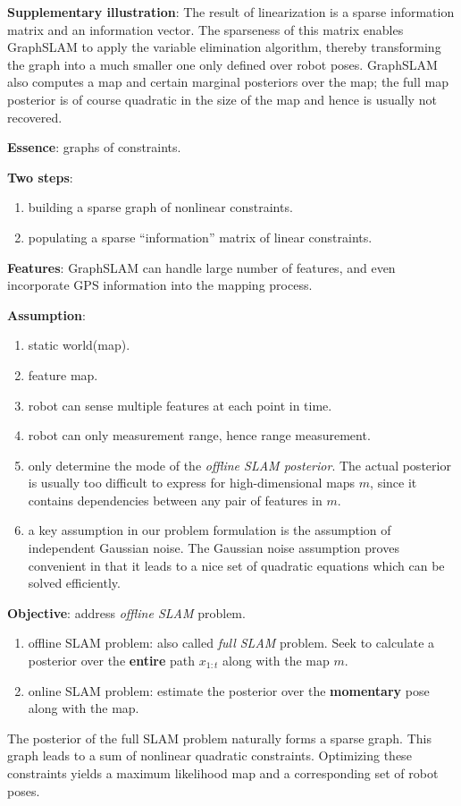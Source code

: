 \textbf{Supplementary illustration}: The result of linearization is a sparse information matrix and an information vector. The sparseness of this matrix enables GraphSLAM to apply the variable elimination algorithm, thereby transforming the graph into a much smaller one only defined over robot poses. GraphSLAM also computes a map and certain marginal posteriors over the map; the full map posterior is of course quadratic in the size of the map and hence is usually not recovered.

\textbf{Essence}: graphs of constraints.

\textbf{Two steps}: 
\begin{enumerate}
    \item building a sparse graph of nonlinear constraints.
    \item populating a sparse “information” matrix of linear constraints.
\end{enumerate}

\textbf{Features}: GraphSLAM can handle large number of features, and even incorporate GPS information into the mapping process.

\textbf{Assumption}: 
\begin{enumerate}
    \item static world(map).
    \item feature map.
    \item robot can sense multiple features at each point in time.
    \item robot can only measurement range, hence range measurement.
    \item only determine the mode of the \textit{offline SLAM posterior}. The actual posterior is usually too difficult to express for high-dimensional maps $m$, since it contains dependencies between any pair of features in $m$.
    \item a key assumption in our problem formulation is the assumption of independent Gaussian noise. The Gaussian noise assumption proves convenient in that it leads to a nice set of quadratic equations which can be solved efficiently.
\end{enumerate}

\textbf{Objective}: address \textit{offline SLAM} problem. 
\begin{enumerate}
    \item offline SLAM problem: also called \textit{full SLAM} problem. Seek to calculate a posterior over the \textbf{entire} path $x_{1:t}$ along with the map $m$. 
    \item online SLAM problem: estimate the posterior over the \textbf{momentary} pose along with the map.
\end{enumerate}
The posterior of the full SLAM problem naturally forms a sparse graph. This graph leads to a sum of nonlinear quadratic constraints. Optimizing these constraints yields a maximum likelihood map and a corresponding set of robot poses.

